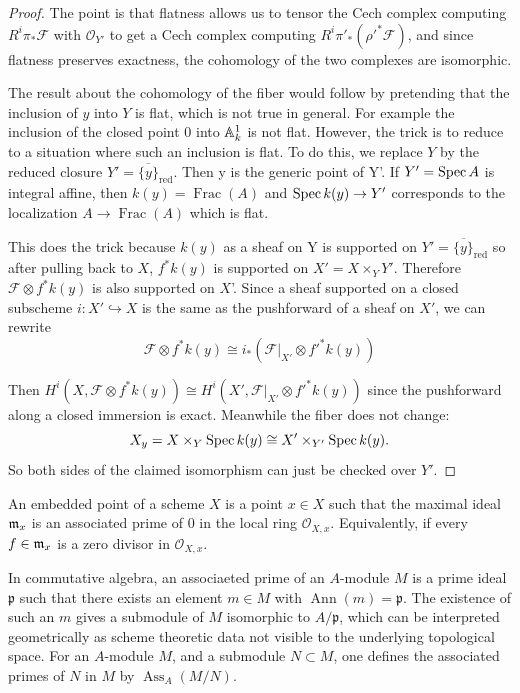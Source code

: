 \documentclass[12pt]{article}
\begin{document}
\begin{proof}
    The point is that flatness allows us to tensor the Cech complex computing $R^i\pi_*\mathcal F$ with $\mathcal O_{Y'}$ to get a Cech complex computing $R^i\pi'_* (\rho'^*\mathcal F)$, and since flatness preserves exactness, the cohomology of the two complexes are isomorphic.

    The result about the cohomology of the fiber would follow by pretending that the inclusion of $y$ into $Y$ is flat, which is not true in general. For example the inclusion of the closed point $0$ into $\mathbb{A}^1_k$ is not flat. However, the trick is to reduce to a situation where such an inclusion is flat. To do this, we replace $Y$ by the reduced closure $Y'=\overline{\{y\}}_{\mathrm{red}}$. Then y is the generic point of Y'. If \(Y'=\operatorname{Spec} A\) is integral affine, then $k(y)=\operatorname{Frac}(A)$ and $\operatorname{Spec} k(y)\to Y'$ corresponds to the localization $A\to \operatorname{Frac}(A)$ which is flat.

    This does the trick because $k(y)$ as a sheaf on Y is supported on $Y'=\overline{\{y\}}_{\mathrm{red}}$ so after pulling back to $X$, $f^*k(y)$ is supported on $X'=X\times_Y Y'$. Therefore $\mathcal F\otimes f^*k(y)$ is also supported on $X$'. Since a sheaf supported on a closed subscheme $i:X'\hookrightarrow X$ is the same as the pushforward of a sheaf on $X'$, we can rewrite
    \[\mathcal F\otimes f^*k(y)
        \cong
        i_*\left(\mathcal F|_{X'}\otimes f'^*k(y)\right)\]

    Then $H^i(X,\mathcal F\otimes f^*k(y))
        \cong
        H^i(X',\mathcal F|_{X'}\otimes f'^*k(y))$ since the pushforward along a closed immersion is exact. Meanwhile the fiber does not change:
    \[
        X_y
        =
        X\times_Y \operatorname{Spec} k(y)
        \cong
        X'\times_{Y'}\operatorname{Spec} k(y).
    \]
    So both sides of the claimed isomorphism can just be checked over $Y'$.
\end{proof}


\begin{definition}
    An embedded point of a scheme $X$ is a point $x\in X$ such that the maximal ideal $\mathfrak{m}_x$ is an associated prime of $0$ in the local ring $\mathcal O_{X,x}$. Equivalently, if every $f\in \mathfrak{m}_x$ is a zero divisor in $\mathcal O_{X,x}$.
\end{definition}

In commutative algebra, an associaeted prime of an $A$-module $M$ is a prime ideal $\mathfrak p$ such that there exists an element $m\in M$ with $\operatorname{Ann}(m) = \mathfrak p$. The existence of such an $m$ gives a submodule of $M$ isomorphic to $A/\mathfrak p$, which can be interpreted geometrically as scheme theoretic data not visible to the underlying topological space. For an $A$-module $M$, and a submodule $N \subset M$, one defines the associated primes of $N$ in $M$ by $\operatorname{Ass}_A(M/N)$.
\end{document}
